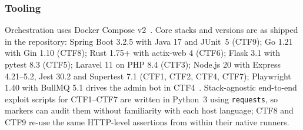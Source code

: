 \subsubsection{Tooling}

Orchestration uses Docker Compose
v2~\cite{DockerDocs}. Core stacks and versions are as
shipped in the repository: Spring Boot 3.2.5 with Java 17
and JUnit~5 (CTF9); Go 1.21 with Gin 1.10 (CTF8); Rust
1.75+ with actix-web 4 (CTF6); Flask 3.1 with pytest 8.3
(CTF5); Laravel 11 on PHP 8.4 (CTF3); Node.js 20 with
Express 4.21--5.2, Jest 30.2 and Supertest 7.1 (CTF1, CTF2,
CTF4, CTF7); Playwright 1.40 with BullMQ 5.1 drives the
admin bot in CTF4~\cite{Playwright}. Stack-agnostic
end-to-end exploit scripts for CTF1--CTF7 are written in
Python~3 using \texttt{requests}, so markers can audit them
without familiarity with each host language; CTF8 and CTF9
re-use the same HTTP-level assertions from within their
native runners.
